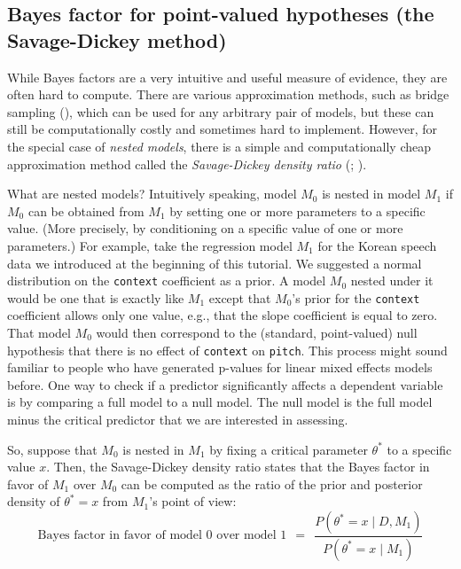 \documentclass[
  doc,
  floatsintext,
  longtable,
  nolmodern,
  notxfonts,
  notimes,
  colorlinks=true,linkcolor=blue,citecolor=blue,urlcolor=blue]{apa7}
\begin{document}
\subsection{Bayes factor for point-valued hypotheses (the Savage-Dickey
method)}\label{bayes-factor-for-point-valued-hypotheses-the-savage-dickey-method}

While Bayes factors are a very intuitive and useful measure of evidence,
they are often hard to compute. There are various approximation methods,
such as bridge sampling
(), which can be used for any arbitrary pair of models, but these
can still be computationally costly and sometimes hard to implement.
However, for the special case of \emph{nested models}, there is a simple
and computationally cheap approximation method called the
\emph{Savage-Dickey density ratio}
(;
).

What are nested models? Intuitively speaking, model \(M_0\) is nested in
model \(M_1\) if \(M_0\) can be obtained from \(M_1\) by setting one or
more parameters to a specific value. (More precisely, by conditioning on
a specific value of one or more parameters.) For example, take the
regression model \(M_1\) for the Korean speech data we introduced at the
beginning of this tutorial. We suggested a normal distribution on the
\texttt{context} coefficient as a prior. A model \(M_0\) nested under it
would be one that is exactly like \(M_1\) except that \(M_0\)'s prior
for the \texttt{context} coefficient allows only one value, e.g., that
the slope coefficient is equal to zero. That model \(M_0\) would then
correspond to the (standard, point-valued) null hypothesis that there is
no effect of \texttt{context} on \texttt{pitch}. This process might
sound familiar to people who have generated p-values for linear mixed
effects models before. One way to check if a predictor significantly
affects a dependent variable is by comparing a full model to a null
model. The null model is the full model minus the critical predictor
that we are interested in assessing.

So, suppose that \(M_0\) is nested in \(M_1\) by fixing a critical
parameter \(\theta^*\) to a specific value \(x\). Then, the
Savage-Dickey density ratio states that the Bayes factor in favor of
\(M_1\) over \(M_0\) can be computed as the ratio of the prior and
posterior density of \(\theta^*=x\) from \(M_1\)'s point of view: \[
\text{Bayes factor in favor of model 0 over model 1} \ \  = \ \  \frac{P(\theta^*=x \mid D, M_1)}{P(\theta^*=x \mid M_1)}
\]
\end{document}

